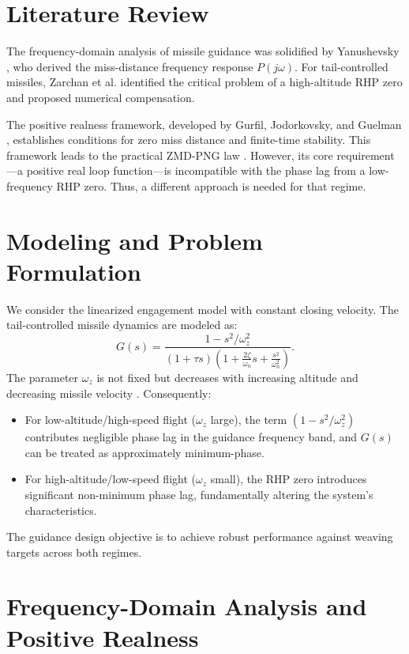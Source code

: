 \documentclass[11pt,a4paper]{article}
\begin{document}
\section{Literature Review}
The frequency-domain analysis of missile guidance was solidified by Yanushevsky \cite{Yanushevsky2007}, who derived the miss-distance frequency response $P(j\omega)$. For tail-controlled missiles, Zarchan et al. \cite{Zarchan2002} identified the critical problem of a high-altitude RHP zero and proposed numerical compensation.

The positive realness framework, developed by Gurfil, Jodorkovsky, and Guelman \cite{Gurfil1998_08, Gurfil1998_11, Gurfil2003}, establishes conditions for zero miss distance and finite-time stability. This framework leads to the practical ZMD-PNG law \cite{Gurfil_2001_08}. However, its core requirement—a positive real loop function—is incompatible with the phase lag from a low-frequency RHP zero. Thus, a different approach is needed for that regime.

\section{Modeling and Problem Formulation}
\label{sec:modeling}
We consider the linearized engagement model with constant closing velocity. The tail-controlled missile dynamics are modeled as:
\begin{equation}
G(s) = \frac{1 - s^2/\omega_z^2}{(1+\tau s)\left(1 + \frac{2\zeta}{\omega_n} s + \frac{s^2}{\omega_n^2}\right)}.
\label{eq:G_tail}
\end{equation}
The parameter $\omega_z$ is not fixed but decreases with increasing altitude and decreasing missile velocity \cite{Zarchan2002}. Consequently:
\begin{itemize}
    \item For low-altitude/high-speed flight ($\omega_z$ large), the term $(1 - s^2/\omega_z^2)$ contributes negligible phase lag in the guidance frequency band, and $G(s)$ can be treated as approximately minimum-phase.
    \item For high-altitude/low-speed flight ($\omega_z$ small), the RHP zero introduces significant non-minimum phase lag, fundamentally altering the system's characteristics.
\end{itemize}
The guidance design objective is to achieve robust performance against weaving targets across both regimes.

\section{Frequency-Domain Analysis and Positive Realness}
\label{sec:analysis}
\end{document}
